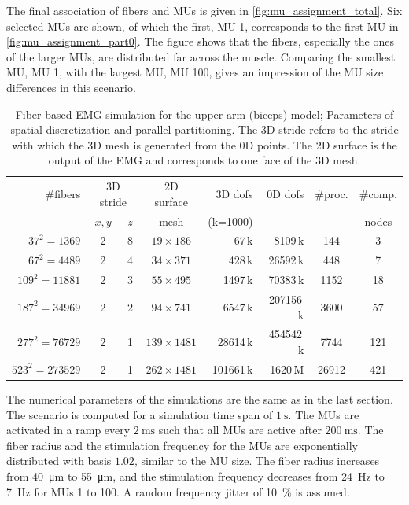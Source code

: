 The final association of fibers and MUs is given in \cref{fig:mu_assignment_total}. Six selected MUs are shown, of which the first, MU 1, corresponds to the first MU in \cref{fig:mu_assignment_part0}. The figure shows that the fibers, especially the ones of the larger MUs, are distributed far across the muscle. Comparing the smallest MU, MU 1, with the largest MU, MU 100, gives an impression of the MU size differences in this scenario.


\begin{table}
  \centering%
  \begin{tabular}{|r|c|c|c|r|r|c|c|}
    \hline
    \#fibers        & \multicolumn{2}{c|}{3D stride} & 2D surface  & 3D dofs    & 0D dofs & \#proc. & \#comp.\\
    \cline{2-3}
                         & $x,y$ & $z$                & mesh       & (k=1000)      &  && nodes\\
    \hline
    $37^2=\num{1369}$    & 2     & 8  & $19 \times 186$  & \num{67}\,k     & \num{8109}\,k  & \num{144} & 3\\[2mm]  %
    $67^2=\num{4489}$    & 2     & 4  & $34 \times 371$  & \num{428}\,k     & \num{26592}\,k  & \num{448} & 7\\[2mm]  %
    $109^2=\num{11881}$  & 2     & 3  & $55 \times 495$  & \num{1497}\,k     & \num{70383}\,k  & \num{1152} & 18\\[2mm]  %
    $187^2=\num{34969}$  & 2     & 2  & $94 \times 741$  & \num{6547}\,k     & \num{207156}\,k  & \num{3600} & 57\\[2mm] %
    $277^2=\num{76729}$  & 2     & 1  & $139 \times 1481$  & \num{28614}\,k  & \num{454542}\,k  & \num{7744} & 121\\[2mm] %
    $523^2=\num{273529}$ & 2     & 1  & $262 \times 1481$  & \num{101661}\,k  & \num{1620}\,M  & \num{26912} & 421\\ %
    \hline
  \end{tabular}
  \caption{Fiber based EMG simulation for the upper arm (biceps) model; Parameters of spatial discretization and parallel partitioning. The 3D stride refers to the stride with which the 3D mesh is generated from the 0D points. The 2D surface is the output of the EMG and corresponds to one face of the 3D mesh.}%
  \label{tab:emg_study_parameters}%
\end{table}

The numerical parameters of the simulations are the same as in the last section. The scenario is computed for a simulation time span of $\SI{1}{\s}$. The MUs are activated in a ramp every $\SI{2}{\ms}$ such that all MUs are active after $\SI{200}{\ms}$. The fiber radius
and the stimulation frequency for the MUs are exponentially distributed with basis $1.02$, similar to the MU size. The fiber radius increases from \SI{40}{\micro\meter} to \SI{55}{\micro\meter}, and the stimulation frequency decreases from \SI{24}{\hertz} to \SI{7}{\hertz} for MUs 1 to 100. A random frequency jitter of \SI{10}{\percent} is assumed.

